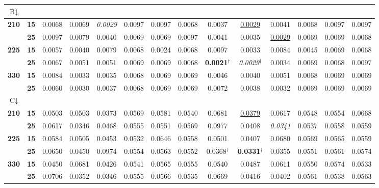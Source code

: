 \begin{sidewaystable}[!htb]
\begin{tabular}{*{14}{c}}
        \midrule
        \multicolumn{14}{l}{\textbf{$\text{B}\downarrow$}} \\
        \midrule
        \multirow{2}{*}{\textbf{210}} & \textbf{15} & 0.0068 & 0.0069 & \textit{0.0029} & 0.0097 & 0.0097 & 0.0068 & 0.0037 & \underline{0.0029} & 0.0041 & 0.0068 & 0.0097 & 0.0097 \\
                                        & \textbf{25} & 0.0097 & 0.0079 & 0.0040 & 0.0069 & 0.0069 & 0.0097 & 0.0041 & 0.0035 & \underline{0.0029} & 0.0069 & 0.0069 & 0.0068 \\
        \multirow{2}{*}{\textbf{225}} & \textbf{15} & 0.0057 & 0.0040 & 0.0079 & 0.0068 & 0.0024 & 0.0068 & 0.0097 & 0.0033 & 0.0084 & 0.0045 & 0.0069 & 0.0068 \\
                                        & \textbf{25} & 0.0067 & 0.0051 & 0.0051 & 0.0069 & 0.0069 & 0.0068 & \textbf{0.0021}$^\dagger$ & \textit{0.0029}$^\dagger$ & 0.0034 & 0.0069 & 0.0068 & 0.0097 \\
        \multirow{2}{*}{\textbf{330}} & \textbf{15} & 0.0084 & 0.0033 & 0.0035 & 0.0068 & 0.0069 & 0.0069 & 0.0046 & 0.0040 & 0.0051 & 0.0068 & 0.0069 & 0.0069 \\
                                        & \textbf{25} & 0.0060 & 0.0030 & 0.0037 & 0.0068 & 0.0069 & 0.0069 & 0.0072 & 0.0038 & 0.0032 & 0.0069 & 0.0069 & 0.0069 \\

        \midrule
        \multicolumn{14}{l}{\textbf{$\text{C}\downarrow$}} \\
        \midrule
        \multirow{2}{*}{\textbf{210}} & \textbf{15} & 0.0503 & 0.0503 & 0.0373 & 0.0569 & 0.0581 & 0.0540 & 0.0681 & \underline{0.0379} & 0.0617 & 0.0548 & 0.0554 & 0.0668 \\
                                        & \textbf{25} & 0.0617 & 0.0346 & 0.0468 & 0.0555 & 0.0551 & 0.0569 & 0.0977 & 0.0408 & \textit{0.0341} & 0.0537 & 0.0558 & 0.0559 \\
        \multirow{2}{*}{\textbf{225}} & \textbf{15} & 0.0584 & 0.0505 & 0.0453 & 0.0532 & 0.0646 & 0.0558 & 0.0501 & 0.0407 & 0.0680 & 0.0569 & 0.0565 & 0.0559 \\
                                        & \textbf{25} & 0.0650 & 0.0450 & 0.0974 & 0.0554 & 0.0563 & 0.0552 & 0.0368$^\dagger$ & \textbf{0.0331}$^\dagger$ & 0.0355 & 0.0551 & 0.0561 & 0.0574 \\
        \multirow{2}{*}{\textbf{330}} & \textbf{15} & 0.0450 & 0.0681 & 0.0426 & 0.0541 & 0.0565 & 0.0555 & 0.0540 & 0.0487 & 0.0611 & 0.0550 & 0.0574 & 0.0533 \\
                                        & \textbf{25} & 0.0706 & 0.0352 & 0.0346 & 0.0555 & 0.0566 & 0.0535 & 0.0669 & 0.0416 & 0.0402 & 0.0561 & 0.0538 & 0.0563 \\
        \bottomrule
    \end{tabular}
\end{sidewaystable}

